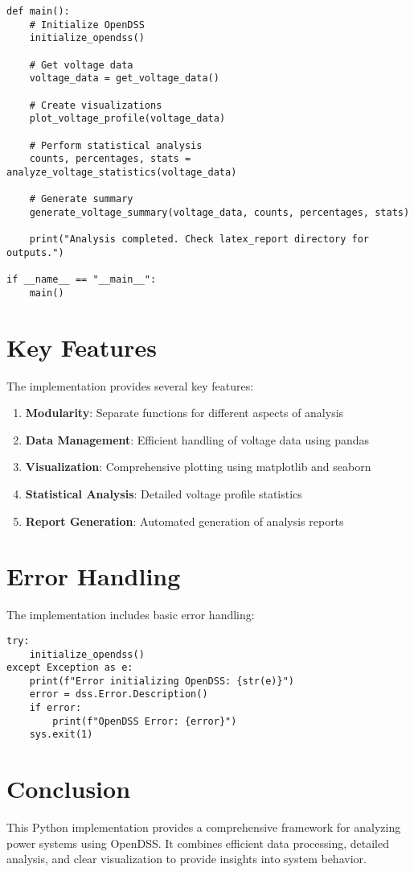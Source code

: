 \documentclass[11pt]{article}
\begin{document}
\begin{lstlisting}[caption=Main Execution Function]
def main():
    # Initialize OpenDSS
    initialize_opendss()
    
    # Get voltage data
    voltage_data = get_voltage_data()
    
    # Create visualizations
    plot_voltage_profile(voltage_data)
    
    # Perform statistical analysis
    counts, percentages, stats = analyze_voltage_statistics(voltage_data)
    
    # Generate summary
    generate_voltage_summary(voltage_data, counts, percentages, stats)
    
    print("Analysis completed. Check latex_report directory for outputs.")

if __name__ == "__main__":
    main()
\end{lstlisting}

\section{Key Features}
The implementation provides several key features:

\begin{enumerate}
    \item \textbf{Modularity}: Separate functions for different aspects of analysis
    \item \textbf{Data Management}: Efficient handling of voltage data using pandas
    \item \textbf{Visualization}: Comprehensive plotting using matplotlib and seaborn
    \item \textbf{Statistical Analysis}: Detailed voltage profile statistics
    \item \textbf{Report Generation}: Automated generation of analysis reports
\end{enumerate}

\section{Error Handling}
The implementation includes basic error handling:

\begin{lstlisting}[caption=Error Handling Example]
try:
    initialize_opendss()
except Exception as e:
    print(f"Error initializing OpenDSS: {str(e)}")
    error = dss.Error.Description()
    if error:
        print(f"OpenDSS Error: {error}")
    sys.exit(1)
\end{lstlisting}

\section{Conclusion}
This Python implementation provides a comprehensive framework for analyzing power systems using OpenDSS. It combines efficient data processing, detailed analysis, and clear visualization to provide insights into system behavior.
\end{document}

